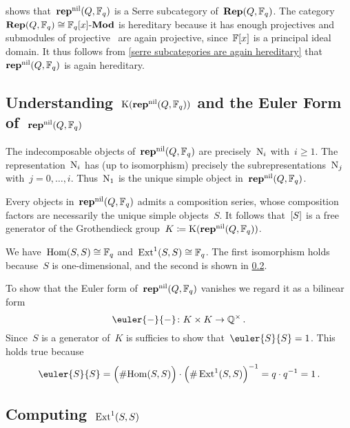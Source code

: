 \documentclass[a4paper, 11pt, twoside=semi]{scrartcl}
\begin{document}
\begin{example}
   shows that~$\mathbf{rep}^{\mathrm{nil}}(Q, \mathbb{F}_q)$ is a Serre subcategory of~$\mathbf{Rep}(Q, \mathbb{F}_q)$.
  The category~$\mathbf{Rep}(Q, \mathbb{F}_q) \cong \mathbb{F}_q[x]\textrm{-}\mathbf{Mod}$ is hereditary because it has enough projectives and submodules of projective~ are again projective, since~$\mathbb{F}[x]$ is a principal ideal domain.
  It thus follows from \cref{serre subcategories are again hereditary} that~$\mathbf{rep}^{\mathrm{nil}}(Q, \mathbb{F}_q)$ is again hereditary.
\end{example}



\subsection{Understanding~$\operatorname{K}(\mathbf{rep}^{\mathrm{nil}}(Q, \mathbb{F}_q))$ and the Euler Form of~$\mathbf{rep}^{\mathrm{nil}}(Q, \mathbb{F}_q)$}
\label{proof of controlling ext}

The indecomposable objects of~$\mathbf{rep}^{\mathrm{nil}}(Q, \mathbb{F}_q)$ are precisely~$\mathrm{N}_i$ with~$i \geq 1$.
The representation~$\mathrm{N}_i$ has (up to isomorphism) precisely the subrepresentations~$\mathrm{N}_j$ with~$j = 0, \dotsc, i$.
Thus~$\mathrm{N}_1$ is the unique simple object in~$\mathbf{rep}^{\mathrm{nil}}(Q, \mathbb{F}_q)$.

Every objects in~$\mathbf{rep}^{\mathrm{nil}}(Q, \mathbb{F}_q)$ admits a composition series, whose composition factors are necessarily the unique simple objects~$S$.
It follows that~$[S]$ is a free generator of the Grothendieck group~$K \coloneqq \operatorname{K}(\mathbf{rep}^{\mathrm{nil}}(Q, \mathbb{F}_q))$.

We have~$\operatorname{Hom}(S, S) \cong \mathbb{F}_q$ and~$\operatorname{Ext}^1(S,S) \cong \mathbb{F}_q$.
The first isomorphism holds because~$S$ is one-dimensional, and the second is shown in \cref{computing ext}.

To show that the Euler form of~$\mathbf{rep}^{\mathrm{nil}}(Q, \mathbb{F}_q)$ vanishes we regard it as a bilinear form
\[
  \euler{-}{-}
  \colon
  K \times K
  \to
  \Rational^\times \,.
\]
Since~$S$ is a generator of~$K$ is sufficies to show that~$\euler{S}{S} = 1$.
This holds true because
\[
  \euler{S}{S}
  =
  \Bigl( \counting {\Hom(S,S)} \Bigr)
  \cdot
  \Bigl( \counting \Ext^1(S,S) \Bigr)^{-1}
  =
  q \cdot q^{-1}
  =
  1 \,.
\]



\subsection{Computing~$\operatorname{Ext}^1(S,S)$}
\label{computing ext}
\end{document}
